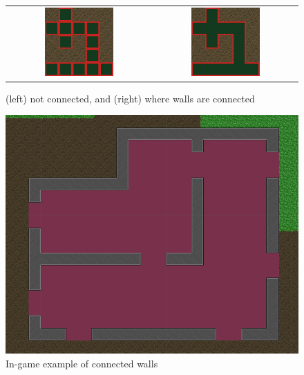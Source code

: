 \begin{figure}[H]
    \centering
    \begin{tabular}{cc}
        \includegraphics[width=0.5\textwidth]{figures/generating_levels/wall_no_border.png}
        &
        \includegraphics[width=0.5\textwidth]{figures/generating_levels/wall_with_border.png}
    \end{tabular}
    \caption{(left) not connected, and (right) where walls are connected}\label{fig:wall_comparison}
\end{figure}

\begin{figure}[H]
    \centering
    \includegraphics[width=1\textwidth]{figures/generating_levels/walls_ingame.png}
    \caption{In-game example of connected walls}\label{fig:walls_ingame} 
\end{figure}

